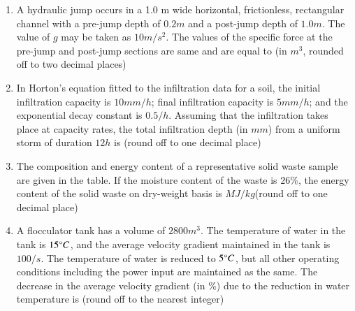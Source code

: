 \documentclass[journal]{IEEEtran}
\begin{document}
\begin{enumerate}
\begin{figure}[H]
    		\centering
    		
    		\caption{}
    		\label{36}
	\end{figure}
	\item
	A hydraulic jump occurs in a 1.0 m wide horizontal, frictionless, rectangular channel with a pre-jump depth of $0.2 m$ and a post-jump depth of $1.0 m$. The value of $g$ may be taken as $10 m/s^2$. The values of the specific force at the pre-jump and post-jump sections are same and are equal to (in $m^3$, rounded off to two decimal places)
	\item
	In Horton's equation fitted to the infiltration data for a soil, the initial infiltration capacity is $10 mm/h$; final infiltration capacity is $5 mm/h$; and the exponential decay constant is $0.5 /h$. Assuming that the infiltration takes place at capacity rates, the total infiltration depth (in $mm$) from a uniform storm of duration $12 h$ is (round off to one decimal place)
	\item
	The composition and energy content of a representative solid waste sample are given in the table. If the moisture content of the waste is $26 \%$, the energy content of the solid waste on dry-weight basis is $MJ/kg$(round off to one decimal place)
		\begin{table}[h!]    	
    			\centering
    			 
		\end{table}
	\item
	A flocculator tank has a volume of $2800 m^3$. The temperature of water in the tank is $15 \degree C$, and the average velocity gradient maintained in the tank is $100/s$. The temperature of water is reduced to $5 \degree C$, but all other operating conditions including the power input are maintained as the same. The decrease in the average velocity gradient (in \%) due to the reduction in water temperature is (round off to the nearest integer)\\
	\end{enumerate}	
\end{document}
